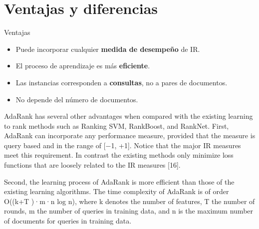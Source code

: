 \documentclass{beamer}
\begin{document}
\section{Ventajas y diferencias}
\begin{frame}{Ventajas}
    \begin{itemize}
        \item Puede incorporar cualquier \textbf{medida de desempeño} de IR.
        \item El proceso de aprendizaje es más \textbf{eficiente}.
        \item Las instancias corresponden a \textbf{consultas}, no a pares de documentos.
        \item No depende del número de documentos.
    \end{itemize}

    \begin{note}
        {AdaRank has several other advantages when compared with the existing learning to rank methods such as Ranking SVM, RankBoost, and RankNet. First, AdaRank can incorporate any performance measure, provided that the measure is query based and in the range of [−1, +1]. Notice that the major IR measures meet this requirement. In contrast the existing methods only minimize loss functions that are loosely related to the IR measures [16].

        Second, the learning process of AdaRank is more efficient than those of the existing learning algorithms. The time complexity of
        AdaRank is of order O((k+T )·m·n log n), where k denotes the number of features, T the number of rounds, m the number of queries in training data, and n is the maximum number of documents for queries in training data.

}
\end{note}
\end{frame}
\end{document}
